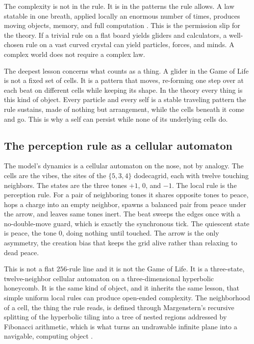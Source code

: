 The complexity is not in the rule. It is in the patterns the rule allows. A law
statable in one breath, applied locally an enormous number of times, produces moving objects, memory, and
full computation \cite{wolfram2020}. This is the permission slip for the theory. If a trivial rule on a
flat board yields gliders and calculators, a well-chosen rule on a vast curved crystal can yield particles,
forces, and minds. A complex world does not require a complex law.

The deepest lesson concerns what counts as a thing. A glider in the Game of Life is not a fixed set of
cells. It is a pattern that moves, re-forming one step over at each beat on different cells while keeping
its shape. In the theory every thing is this kind of object. Every particle and every self is a stable
traveling pattern the rule sustains, made of nothing but arrangement, while the cells beneath it come and
go. This is why a self can persist while none of its underlying cells do.

\subsection{The perception rule as a cellular automaton}

The model's dynamics is a cellular automaton on the nose, not by analogy. The cells are the vibes, the
sites of the $\{5,3,4\}$ dodecagrid, each with twelve touching neighbors. The states are the three tones
$+1$, $0$, and $-1$. The local rule is the perception rule. For a pair of neighboring tones it shares
opposite tones to peace, hops a charge into an empty neighbor, spawns a balanced pair from peace under the
arrow, and leaves same tones inert. The beat sweeps the edges once with a no-double-move guard, which is
exactly the synchronous tick. The quiescent state is peace, the tone $0$, doing nothing until touched. The
arrow is the only asymmetry, the creation bias that keeps the grid alive rather than relaxing to dead peace.

This is not a flat $256$-rule line and it is not the Game of Life. It is a three-state, twelve-neighbor
cellular automaton on a three-dimensional hyperbolic honeycomb. It is the same kind of object, and it
inherits the same lesson, that simple uniform local rules can produce open-ended complexity. The
neighborhood of a cell, the thing the rule reads, is defined through Margenstern's recursive splitting of
the hyperbolic tiling into a tree of nested regions addressed by Fibonacci arithmetic, which is what turns
an undrawable infinite plane into a navigable, computing object \cite{margenstern2008}.

